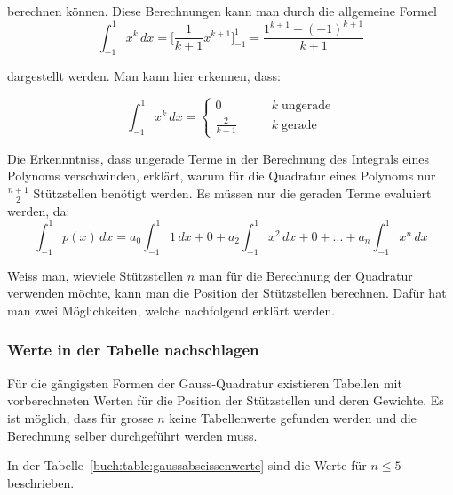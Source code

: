 berechnen können. Diese Berechnungen kann man durch die allgemeine Formel
\begin{equation}
    \int_{-1}^{1} x^{k}\,dx 
    = 
    \bigg[\frac{1}{k+1} x^{k+1}\bigg]_{-1}^{1}
    =
    \frac{1^{k+1} - (-1)^{k+1}}{k+1}  
\end{equation}

dargestellt werden. Man kann hier erkennen, dass:

\begin{equation}
    \int_{-1}^{1} x^{k}\,dx 
    =
    \begin{cases}
        0&\qquad k \; \text{ungerade}\\
        \frac{2}{k+1}&\qquad k \; \text{gerade}
        \end{cases}  
\end{equation}

Die Erkennntniss, dass ungerade Terme in der Berechnung 
des Integrals eines Polynoms verschwinden, 
erklärt, warum für die Quadratur eines Polynoms nur $\frac{n+1}{2}$ 
Stützstellen benötigt werden. Es müssen nur die geraden Terme evaluiert werden,
da:
\begin{equation}
    \int_{-1}^{1} p(x)\,dx 
    =
    a_{0} \int_{-1}^{1} 1\,dx
    +
    0
    + 
    a_{2}\int_{-1}^{1} x^{2} \,dx  
    +
    0
    +
    ... 
    +
    a_{n}\int_{-1}^{1} x^{n}\,dx
\end{equation}

Weiss man, wieviele Stützstellen $n$ man für die Berechnung der Quadratur verwenden möchte,
kann man die Position der Stützstellen berechnen. 
Dafür hat man zwei Möglichkeiten, welche nachfolgend erklärt werden.

\subsubsection{Werte in der Tabelle nachschlagen}
Für die gängigsten Formen der Gauss-Quadratur existieren Tabellen mit vorberechneten Werten für die
Position der Stützstellen und deren Gewichte. 
Es ist möglich, dass für grosse $n$ keine Tabellenwerte gefunden werden und die Berechnung 
selber durchgeführt werden muss.

In der Tabelle~\ref{buch:table:gaussabscissenwerte} sind die Werte für $n \leq 5$ beschrieben.

